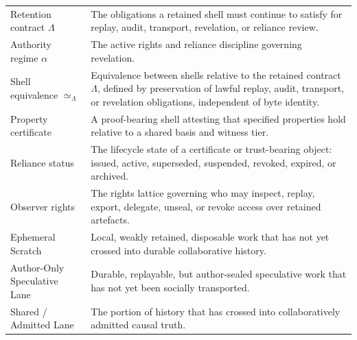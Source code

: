 \documentclass{aion}
\begin{document}
\begin{center}
\begin{tabularx}{\textwidth}{@{}>{\raggedright\arraybackslash}p{}X@{}}
			Retention contract \(\Lambda\)         & The obligations a retained shell must continue to satisfy for replay, audit, transport, revelation, or reliance review.                                                                                        \\
			Authority regime \(\alpha\)            & The active rights and reliance discipline governing revelation.                                                                                                                                                \\
			Shell equivalence \(\simeq_{\Lambda}\) & Equivalence between shells relative to the retained contract \(\Lambda\), defined by preservation of lawful replay, audit, transport, or revelation obligations, independent of byte identity.                \\
		Property certificate                   & A proof-bearing shell attesting that specified properties hold relative to a shared basis and witness tier.                                                                                                    \\
		Reliance status                        & The lifecycle state of a certificate or trust-bearing object: issued, active, superseded, suspended, revoked, expired, or archived.                                                                            \\
		Observer rights                        & The rights lattice governing who may inspect, replay, export, delegate, unseal, or revoke access over retained artefacts.                                                                                      \\
		Ephemeral Scratch                      & Local, weakly retained, disposable work that has not yet crossed into durable collaborative history.                                                                                                           \\
		Author-Only Speculative Lane           & Durable, replayable, but author-sealed speculative work that has not yet been socially transported.                                                                                                            \\
			Shared / Admitted Lane                 & The portion of history that has crossed into collaboratively admitted causal truth.                                                                                                                            \\
			\bottomrule
		\end{tabularx}
		\AIONTableStyleOff
	\end{center}

\endgroup

\clearpage


\end{document}
